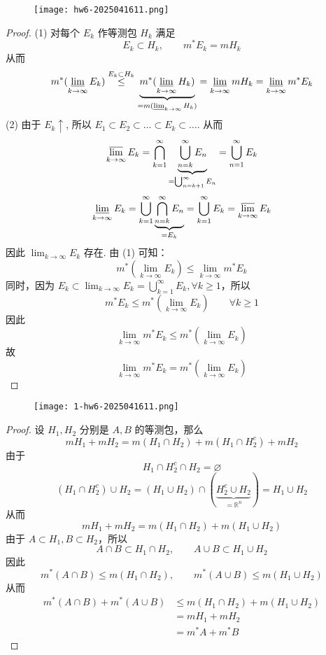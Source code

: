 \begin{exercise}
\begin{figure}[H]
\centering
\texttt{[image: hw6-2025041611.png]}
\label{}
\end{figure}
\end{exercise}
\begin{proof}
(1) 对每个 $E_k$ 作等测包 $H_k$ 满足
\[
E_k\subset H_k,\qquad m^{*}E_k=mH_k
\]
从而
\[
m^{*}(\varliminf_{ k \to \infty } E_k)\overset{ E_k\subset H_k }{ \leq  }\underbrace{ m^{*}(\varliminf_{ k \to \infty } H_k) }_{ =m(\varliminf_{ k \to \infty } H_k) }=\varliminf_{ k \to \infty } mH_k=\varliminf_{ k \to \infty } m^{*}E_k
\]
(2) 由于 $E_k\uparrow$, 所以 $E_1\subset E_2\subset\dots \subset E_k\subset\dots$. 从而
\[
\varlimsup_{ k \to \infty } E_k=\bigcap_{k=1}^{\infty}\underbrace{ \bigcup_{n=k}^{\infty} E_n }_{ =\bigcup_{n=k+1}^{\infty} E_n }=\bigcup_{n=1}^{\infty} E_k
\]
\[
\varliminf_{ k \to \infty } E_k=\bigcup_{k=1}^{\infty} \underbrace{ \bigcap_{n=k}^{\infty} E_n }_{ =E_k }=\bigcup_{k=1}^{\infty} E_k=\varlimsup_{ k \to \infty } E_k
\]
因此 $\lim_{ k \to \infty }E_k$ 存在. 由 (1) 可知：
\[
m^{*}(\lim_{ k \to \infty } E_k)\leq \lim_{ k \to \infty } m^{*}E_k
\]
同时，因为 $E_k\subset \lim_{ k \to \infty }E_k=\bigcup_{k=1}^{\infty}E_k,\forall k\geq1$，所以
\[
m^{*}E_k\leq  m^{*}(\lim_{ k \to \infty } E_k)\qquad \forall k\geq 1
\]
因此
\[
\lim_{ k \to \infty } m^{*}E_k\leq m^{*}(\lim_{ k \to \infty } E_k)
\]
故
\[
\lim_{ k \to \infty } m^{*}E_k=m^{*}(\lim_{ k \to \infty } E_k)
\]
\end{proof}

\begin{exercise}
\begin{figure}[H]
\centering
\texttt{[image: 1-hw6-2025041611.png]}
\label{}
\end{figure}
\end{exercise}
\begin{proof}
设 $H_1,H_2$ 分别是 $A,B$ 的等测包，那么
\[
mH_1+mH_2=m(H_1\cap H_2)+m(H_1\cap H_2^{c})+mH_2
\]
由于
\[
H_1\cap H_2^{c}\cap H_2=\varnothing
\]
\[
(H_1\cap H_2^{c})\cup H_2=(H_1\cup H_2)\cap(\underbrace{ H_2^{c}\cup H_2 }_{ =\mathbb{R}^{n} })=H_1\cup H_2
\]
从而
\[
mH_1+mH_2=m(H_1\cap H_2)+m(H_1\cup H_2)
\]
由于 $A\subset H_1,B\subset H_2$，所以
\[
A\cap B\subset H_1\cap H_2,\qquad A\cup B\subset H_1\cup H_2
\]
因此
\[
m^{*}(A\cap B)\leq m(H_1\cap H_2),\qquad m^{*}(A\cup B)\leq m(H_1\cup H_2)
\]
从而
\[
\begin{aligned}
m^{*}(A\cap B)+m^{*}(A\cup B) & \leq m(H_1\cap H_2)+m(H_1\cup H_2) \\
 & =mH_1+mH_2 \\
 & =m^{*}A+m^{*}B
\end{aligned}
\]
\end{proof}

